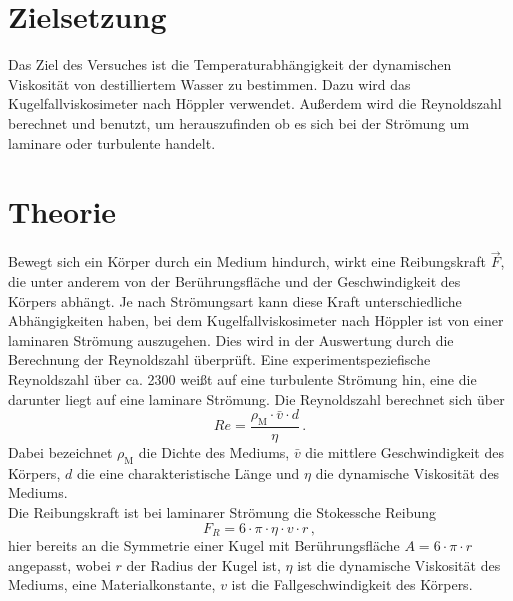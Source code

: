 \section{Zielsetzung}
\label{sec:Zielsetzung}
Das Ziel des Versuches ist die Temperaturabhängigkeit der dynamischen 
Viskosität von destilliertem Wasser zu bestimmen. Dazu wird das 
Kugelfallviskosimeter nach Höppler verwendet. Außerdem wird die Reynoldszahl 
berechnet und benutzt, um herauszufinden ob es sich bei der Strömung um 
laminare oder turbulente handelt. 
%
%
%
\section{Theorie}
\label{sec:Theorie}
Bewegt sich ein Körper durch ein Medium hindurch, wirkt eine Reibungskraft 
$\vec{F}$, die unter anderem von der Berührungsfläche und der Geschwindigkeit
des Körpers abhängt. Je nach Strömungsart kann diese Kraft 
unterschiedliche Abhängigkeiten haben, bei dem Kugelfallviskosimeter nach 
Höppler ist von einer laminaren Strömung auszugehen. 
Dies wird in der Auswertung durch die
Berechnung der Reynoldszahl überprüft. Eine experimentspeziefische 
Reynoldszahl über ca. 2300 weißt auf eine turbulente Strömung hin, eine die
darunter liegt auf eine laminare Strömung. Die Reynoldszahl berechnet sich
über 
\begin{equation}
    Re = \frac{\rho_{\text{M}} \cdot \bar{v} \cdot d}{\eta}\,. 
    \label{equ:Reynoldszahl}
\end{equation}
Dabei bezeichnet $\rho_{\text{M}}$ die Dichte des Mediums, $\bar{v}$
die mittlere Geschwindigkeit des Körpers, $d$ die eine charakteristische 
Länge und $\eta$ die dynamische Viskosität des Mediums. \\
Die Reibungskraft ist bei laminarer Strömung die Stokessche Reibung
\begin{equation}
    F_{R} = 6 \cdot \pi \cdot \eta \cdot v \cdot r \, , 
    \label{equ:Stokesreibungskraft}
\end{equation}
hier bereits an die Symmetrie einer Kugel mit Berührungsfläche 
$A = 6 \cdot \pi \cdot r$ angepasst, wobei $r$ der Radius der Kugel ist, 
$\eta$ ist die dynamische Viskosität des Mediums, eine Materialkonstante,
$v$ ist die Fallgeschwindigkeit des Körpers. \\
%
%
%
